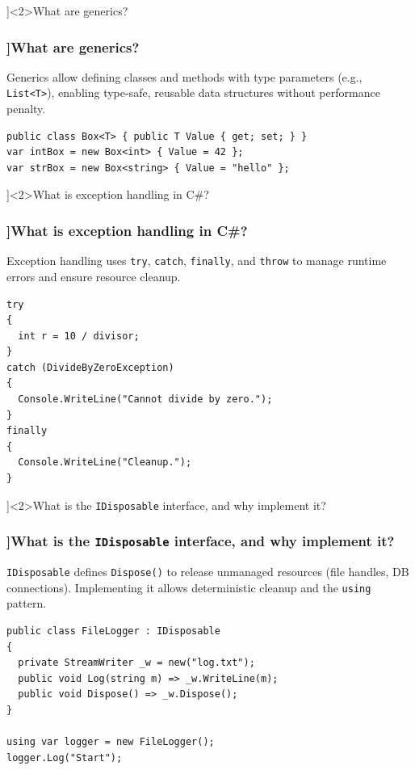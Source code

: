 \QuestionSlide[\CategoryBadge[LangColor!20]{Language Feature}]<2>{What are generics?}
\begin{frame}[fragile]
  \frametitle{\AnswerTitle[\CategoryBadge[LangColor!20]{Language Feature}]{What are generics?}}

  {\footnotesize
    Generics allow defining classes and methods with type parameters (e.g., \texttt{List<T>}), enabling type-safe, reusable data structures without performance penalty.
  }

  \begin{verbatim}
public class Box<T> { public T Value { get; set; } }
var intBox = new Box<int> { Value = 42 };
var strBox = new Box<string> { Value = "hello" };
  \end{verbatim}
\end{frame}

\QuestionSlide[\CategoryBadge[LangColor!20]{Language Feature}]<2>{What is exception handling in C\#?}
\begin{frame}[fragile]
  \frametitle{\AnswerTitle[\CategoryBadge[LangColor!20]{Language Feature}]{What is exception handling in C\#?}}

  {\footnotesize
    Exception handling uses \texttt{try}, \texttt{catch}, \texttt{finally}, and \texttt{throw} to manage runtime errors and ensure resource cleanup.
  }

  \begin{verbatim}
try
{
  int r = 10 / divisor;
}
catch (DivideByZeroException)
{
  Console.WriteLine("Cannot divide by zero.");
}
finally
{
  Console.WriteLine("Cleanup.");
}
  \end{verbatim}
\end{frame}

\QuestionSlide[\CategoryBadge[LangColor!20]{Language Feature}]<2>{What is the \texttt{IDisposable} interface, and why implement it?}
\begin{frame}[fragile]
  \frametitle{\AnswerTitle[\CategoryBadge[LangColor!20]{Language Feature}]{What is the \texttt{IDisposable} interface, and why implement it?}}

  {\footnotesize
    \texttt{IDisposable} defines \texttt{Dispose()} to release unmanaged resources (file handles, DB connections). Implementing it allows deterministic cleanup and the \texttt{using} pattern.
  }

  \begin{verbatim}
public class FileLogger : IDisposable
{
  private StreamWriter _w = new("log.txt");
  public void Log(string m) => _w.WriteLine(m);
  public void Dispose() => _w.Dispose();
}

using var logger = new FileLogger();
logger.Log("Start");
  \end{verbatim}
\end{frame}

